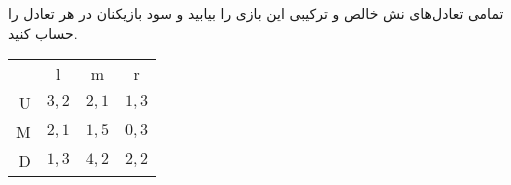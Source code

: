 تمامی تعادل‌های نش خالص و ترکیبی این بازی را بیابید و سود بازیکنان در هر تعادل را حساب کنید.
\LTR 
\begin{latin}
    \begin{center}
        \begin{tabular}{r | c | c | c |}
            \multicolumn{1}{r}{} &
            \multicolumn{1}{c}{l} &
            \multicolumn{1}{c}{m} &
            \multicolumn{1}{c}{r} \\ \cline{2-4}
            U       & $3,2$   & $2,1$     & $1,3$  \\ \cline{2-4}
            M       & $2,1$   & $1,5$     & $0,3$  \\ \cline{2-4}
            D       & $1,3$   & $4,2$     & $2,2$  \\ \cline{2-4}
        \end{tabular}
    \end{center}
\end{latin}
\RTL
